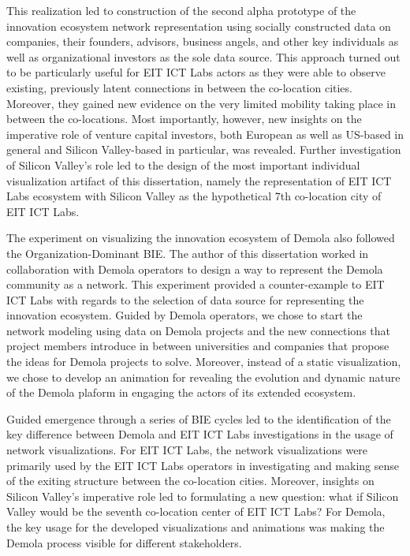 This realization led to construction of the second alpha prototype of the innovation ecosystem network representation using socially constructed data on companies, their founders, advisors, business angels, and other key individuals as well as organizational investors as the sole data source. This approach turned out to be particularly useful for EIT ICT Labs actors as they were able to observe existing, previously latent connections in between the co-location cities. Moreover, they gained new evidence on the very limited mobility taking place in between the co-locations. Most importantly, however, new insights on the imperative role of venture capital investors, both European as well as US-based in general and Silicon Valley-based in particular, was revealed. Further investigation of Silicon Valley's role led to the design of the most important individual visualization artifact of this dissertation, namely the representation of EIT ICT Labs ecosystem with Silicon Valley as the hypothetical 7th co-location city of EIT ICT Labs.

The experiment on visualizing the innovation ecosystem of Demola also followed the Organization-Dominant BIE. The author of this dissertation worked in collaboration with Demola operators to design a way to represent the Demola community as a network. This experiment provided a counter-example to EIT ICT Labs with regards to the selection of data source for representing the innovation ecosystem. Guided by Demola operators, we chose to start the network modeling using data on Demola projects and the new connections that project members introduce in between universities and companies that propose the ideas for Demola projects to solve. Moreover, instead of a static visualization, we chose to develop an animation for revealing the evolution and dynamic nature of the Demola plaform in engaging the actors of its extended ecosystem. 

Guided emergence through a series of BIE cycles led to the identification of the key difference between Demola and EIT ICT Labs investigations in the usage of network visualizations. For EIT ICT Labs, the network visualizations were primarily used by the EIT ICT Labs operators in investigating and making sense of the exiting structure between the co-location cities. Moreover, insights on Silicon Valley's imperative role led to formulating a new question: what if Silicon Valley would be the seventh co-location center of EIT ICT Labs? For Demola, the key usage for the developed visualizations and animations was making the Demola process visible for different stakeholders.

